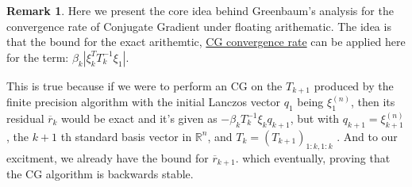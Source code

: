 \documentclass[]{article}
\theoremstyle{definition}
\newtheorem{remark}{Remark}[subsection]
\begin{document}
            \begin{remark}\label{remark:CG_Float_Remark}
                Here we present the core idea behind Greenbaum's analysis for the convergence rate of Conjugate Gradient under floating arithematic. The idea is that the bound for the exact arithemtic, \hyperref[theorem:CG_Convergence_Rate]{CG convergence rate} can be applied here for the term: 
                $\beta_k |
                \xi_k^T T_k^{-1}\xi_1|$. 
                \par
                This is true because if we were to perform an CG on the $T_{k + 1}$ produced by the finite precision algorithm with the initial Lanczos vector $q_1$ being $\xi_1^{(n)}$, then its residual $\overline{r}_{k}$ would be exact and it's given as $-\beta_kT_{k}^{-1}\xi_kq_{k + 1}$, but with $q_{k + 1} = \xi_{k + 1}^{(n)}$, the $k + 1$ th standard basis vector in $\mathbb R^{n}$, and $T_k = (T_{k + 1})_{1:k, 1:k}$ . And to our excitment, we already have the bound for $\overline{r}_{k+1}$. which eventually, proving that the CG algorithm is backwards stable. 
            \end{remark}
        
\end{document}
